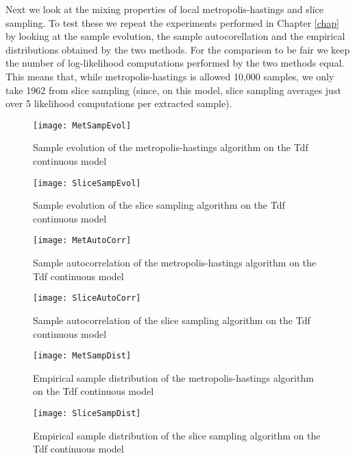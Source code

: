 Next we look at the mixing properties of local metropolis-hastings and slice sampling. To test these we repeat the experiments performed in Chapter \ref{chap} by looking at the sample evolution, the sample autocorellation and the empirical distributions obtained by the two methods.
For the comparison to be fair we keep the number of log-likelihood computations performed by the two methods equal. This means that, while metropolis-hastings is allowed 10,000 samples, we only take 1962 from slice sampling (since, on this model, slice sampling averages just over 5 likelihood computations per extracted sample).

\begin{figure}[H]
    \centering
    \texttt{[image: MetSampEvol]}
    \caption{Sample evolution of the metropolis-hastings algorithm on the Tdf continuous model}
    \label{fig:MetSampEvol}
\end{figure}

\begin{figure}[H]
    \centering
    \texttt{[image: SliceSampEvol]}
    \caption{Sample evolution of the slice sampling algorithm on the Tdf continuous model}
    \label{fig:SliceSampEvol}
\end{figure}

\begin{figure}[H]
    \centering
    \texttt{[image: MetAutoCorr]}
    \caption{Sample autocorrelation of the metropolis-hastings algorithm on the Tdf continuous model}
    \label{fig:MetAutoCorr}
\end{figure}

\begin{figure}[H]
    \centering
    \texttt{[image: SliceAutoCorr]}
    \caption{Sample autocorrelation of the slice sampling algorithm on the Tdf continuous model}
    \label{fig:SliceAutoCorr}
\end{figure}

\begin{figure}[H]
    \centering
    \texttt{[image: MetSampDist]}
    \caption{Empirical sample distribution of the metropolis-hastings algorithm on the Tdf continuous model}
    \label{fig:MetSampDist}
\end{figure}

\begin{figure}[H]
    \centering
    \texttt{[image: SliceSampDist]}
    \caption{Empirical sample distribution of the slice sampling algorithm on the Tdf continuous model}
    \label{fig:SliceSampDist}
\end{figure}

